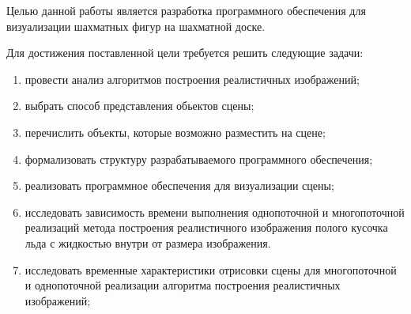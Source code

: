 
Целью данной работы является разработка программного обеспечения для визуализации шахматных фигур на шахматной доске.

Для достижения поставленной цели требуется решить следующие задачи:
\begin{enumerate}[label={\arabic*)}]
	\item провести анализ алгоритмов построения реалистичных изображений;
	\item выбрать способ представления обьектов сцены;
	\item перечислить объекты, которые возможно разместить на сцене;
	\item формализовать структуру разрабатываемого программного обеспечения;
	\item реализовать программное обеспечения для визуализации сцены;
	\item исследовать зависимость времени выполнения однопоточной и многопоточной реализаций метода построения реалистичного изображения полого кусочка льда с жидкостью внутри от размера изображения.
	\item исследовать временные характеристики отрисовки сцены для многопоточной и однопоточной реализации алгоритма построения реалистичных изображений;
\end{enumerate}

\clearpage
